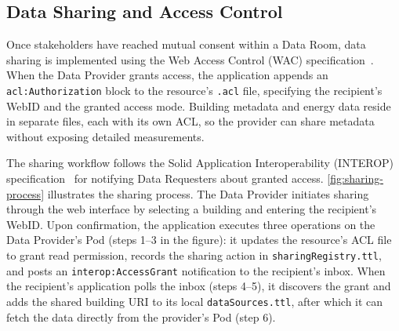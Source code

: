 \documentclass[
]{ceurart}
\begin{document}


\subsection{Data Sharing and Access Control}

Once stakeholders have reached mutual consent within a Data Room, data sharing is implemented using the Web Access Control (WAC) specification~\cite{BernersLee2024WAC}.
When the Data Provider grants access, the application appends an \texttt{acl:Authorization} block to the resource's \texttt{.acl} file, specifying the recipient's WebID and the granted access mode.
Building metadata and energy data reside in separate files, each with its own ACL, so the provider can share metadata without exposing detailed measurements.

The sharing workflow follows the Solid Application Interoperability (INTEROP) specification~\cite{Bingham2025Interop} for notifying Data Requesters about granted access.
\cref{fig:sharing-process} illustrates the sharing process.
The Data Provider initiates sharing through the web interface by selecting a building and entering the recipient's WebID.
Upon confirmation, the application executes three operations on the Data Provider's Pod (steps 1--3 in the figure): it updates the resource's ACL file to grant read permission, records the sharing action in \texttt{sharingRegistry.ttl}, and posts an \texttt{interop:AccessGrant} notification to the recipient's inbox.
When the recipient's application polls the inbox (steps 4--5), it discovers the grant and adds the shared building URI to its local \texttt{dataSources.ttl}, after which it can fetch the data directly from the provider's Pod (step 6).
\end{document}
